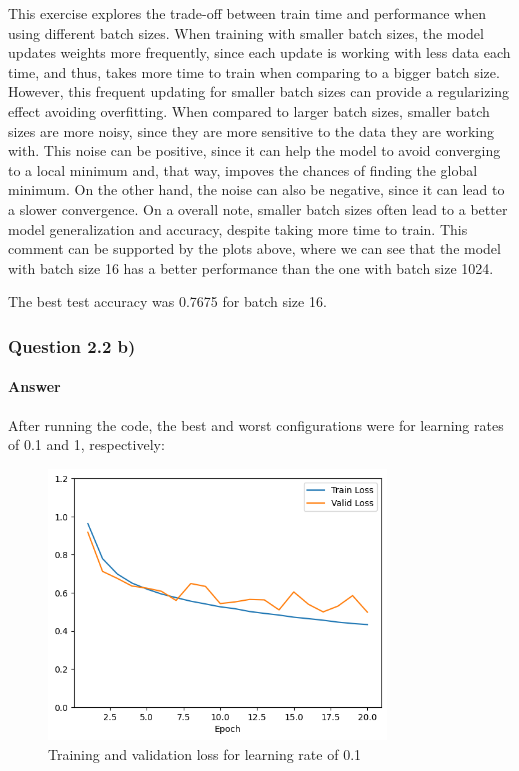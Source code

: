 \documentclass{article}
\begin{document}
This exercise explores the trade-off between train time and performance when using different batch sizes. When training with smaller batch sizes, the model updates weights more frequently,
since each update is working with less data each time, and thus, takes more time to train when comparing to a bigger batch size. However, this frequent updating for smaller batch sizes can 
provide a regularizing effect avoiding overfitting. When compared to larger batch sizes, smaller batch sizes are more noisy, since they are more sensitive to the data they are working with. This noise can be positive, since it can help the model
to avoid converging to a local minimum and, that way, impoves the chances of finding the global minimum. On the other hand, the noise can also be negative, since it can lead to a slower convergence. On a overall note, smaller batch sizes often lead to a better 
model generalization and accuracy, despite taking more time to train. This comment can be supported by the plots above, where we can see that the model with batch size 16 has a better performance than the one with batch size 1024.

The best test accuracy was 0.7675 for batch size 16.

\subsubsection{Question 2.2 b)}
\paragraph{Answer} After running the code, the best and worst configurations were for learning rates of 0.1 and 1, respectively:

\begin{figure}[H]
    \centering
    \includegraphics[width=0.8\textwidth]{"plots/mlp-training-loss-batch-16-lr-0.1-epochs-20-hidden-200-dropout-0.0-l2-0-layers-2-act-relu-opt-sgd.png"}
    \caption{Training and validation loss for learning rate of 0.1}
    \label{2.2b learning rate 0.1}
\end{figure}
\end{document}
